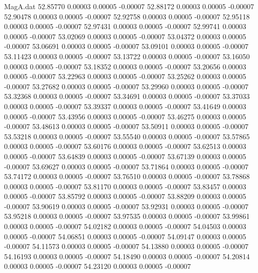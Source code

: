 \begin{filecontents}{MagA.dat}
  52.85770    0.00003    0.00005   -0.00007
  52.88172    0.00003    0.00005   -0.00007
  52.90478    0.00003    0.00005   -0.00007
  52.92758    0.00003    0.00005   -0.00007
  52.95118    0.00003    0.00005   -0.00007
  52.97431    0.00003    0.00005   -0.00007
  52.99741    0.00003    0.00005   -0.00007
  53.02069    0.00003    0.00005   -0.00007
  53.04372    0.00003    0.00005   -0.00007
  53.06691    0.00003    0.00005   -0.00007
  53.09101    0.00003    0.00005   -0.00007
  53.11423    0.00003    0.00005   -0.00007
  53.13722    0.00003    0.00005   -0.00007
  53.16050    0.00003    0.00005   -0.00007
  53.18352    0.00003    0.00005   -0.00007
  53.20656    0.00003    0.00005   -0.00007
  53.22963    0.00003    0.00005   -0.00007
  53.25262    0.00003    0.00005   -0.00007
  53.27682    0.00003    0.00005   -0.00007
  53.29960    0.00003    0.00005   -0.00007
  53.32368    0.00003    0.00005   -0.00007
  53.34691    0.00003    0.00005   -0.00007
  53.37033    0.00003    0.00005   -0.00007
  53.39337    0.00003    0.00005   -0.00007
  53.41649    0.00003    0.00005   -0.00007
  53.43956    0.00003    0.00005   -0.00007
  53.46275    0.00003    0.00005   -0.00007
  53.48613    0.00003    0.00005   -0.00007
  53.50911    0.00003    0.00005   -0.00007
  53.53218    0.00003    0.00005   -0.00007
  53.55540    0.00003    0.00005   -0.00007
  53.57865    0.00003    0.00005   -0.00007
  53.60176    0.00003    0.00005   -0.00007
  53.62513    0.00003    0.00005   -0.00007
  53.64839    0.00003    0.00005   -0.00007
  53.67139    0.00003    0.00005   -0.00007
  53.69627    0.00003    0.00005   -0.00007
  53.71864    0.00003    0.00005   -0.00007
  53.74172    0.00003    0.00005   -0.00007
  53.76510    0.00003    0.00005   -0.00007
  53.78868    0.00003    0.00005   -0.00007
  53.81170    0.00003    0.00005   -0.00007
  53.83457    0.00003    0.00005   -0.00007
  53.85792    0.00003    0.00005   -0.00007
  53.88209    0.00003    0.00005   -0.00007
  53.90619    0.00003    0.00005   -0.00007
  53.92931    0.00003    0.00005   -0.00007
  53.95218    0.00003    0.00005   -0.00007
  53.97535    0.00003    0.00005   -0.00007
  53.99861    0.00003    0.00005   -0.00007
  54.02182    0.00003    0.00005   -0.00007
  54.04503    0.00003    0.00005   -0.00007
  54.06851    0.00003    0.00005   -0.00007
  54.09147    0.00003    0.00005   -0.00007
  54.11573    0.00003    0.00005   -0.00007
  54.13880    0.00003    0.00005   -0.00007
  54.16193    0.00003    0.00005   -0.00007
  54.18490    0.00003    0.00005   -0.00007
  54.20814    0.00003    0.00005   -0.00007
  54.23120    0.00003    0.00005   -0.00007

\end{filecontents}
